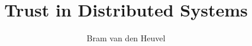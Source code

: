 \usepackage{geometry}
\usepackage[english]{babel}

\usepackage{amsmath}
\usepackage{dsfont}

\usepackage{blindtext}
\usepackage{todonotes}

\author{Bram van den Heuvel}
\title{Trust in Distributed Systems}
